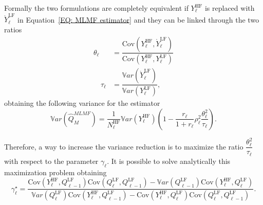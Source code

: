 Formally the two formulations are completely equivalent if $Y_\ell^{\mathrm{HF}}$ is replaced with $\mathring{Y}^{\mathrm{LF}}_{\ell}$ in 
Equation~\eqref{EQ: MLMF estimator} and they can be linked through the two ratios
  \begin{equation}
 \begin{split}
 \theta_{\ell} &= \dfrac{  \mathrm{Cov}\left(  Y^{\mathrm{HF}}_{\ell},\mathring{Y}^{\mathrm{LF}}_{\ell} \right)   }
                        {  \mathrm{Cov}\left( Y^{\mathrm{HF}}_{\ell},Y^{\mathrm{LF}}_{\ell} \right)  } \\
 \quad \tau_{\ell}  &= \dfrac{  \mathbb{V}ar\left(  \mathring{Y}^{\mathrm{LF}}_{\ell} \right)  }{ \mathbb{V}ar\left( Y^{\mathrm{LF}}_{\ell} \right) },
 \end{split}
\end{equation}
obtaining the following variance for the estimator
\begin{equation}
 \mathbb{V}ar\left(\hat{Q}_M^{MLMF} \right) = \dfrac{1}{N_{\ell}^{\mathrm{HF}}} \mathbb{V}ar\left( Y^{\mathrm{HF}}_{\ell} \right) 
 \left( 1 - \dfrac{r_\ell}{1+r_\ell} \rho_\ell^2 \dfrac{\theta_\ell^2}{\tau_\ell} \right).
\end{equation}

Therefore, a way to increase the variance reduction is to maximize the ratio $\dfrac{\theta_\ell^2}{\tau_\ell}$ with respect to the 
parameter $\gamma_\ell$. It is possible to solve analytically this maximization problem obtaining 
\begin{equation}
\gamma_\ell^\star= \dfrac{ \mathrm{Cov}\left(  Y^{\mathrm{HF}}_{\ell},Q_{\ell-1}^{\mathrm{LF}} \right) \mathrm{Cov}\left( Q_{\ell}^{\mathrm{LF}},Q_{\ell-1}^{\mathrm{LF}} \right) 
                   - \mathbb{V}ar\left(Q_{\ell-1}^{\mathrm{LF}}\right) \mathrm{Cov}\left(  Y^{\mathrm{HF}}_{\ell},Q_{\ell}^{\mathrm{LF}} \right) }
            { \mathbb{V}ar\left(Q_{\ell}^{\mathrm{LF}}\right) \mathrm{Cov}\left( Y^{\mathrm{HF}}_{\ell},Q_{\ell-1}^{\mathrm{LF}} \right) 
            - \mathrm{Cov}\left( Y^{\mathrm{HF}}_{\ell},Q_{\ell}^{\mathrm{LF}} \right) \mathrm{Cov}\left( Q_{\ell}^{\mathrm{LF}},Q_{\ell-1}^{\mathrm{LF}} \right) }.
\end{equation}

